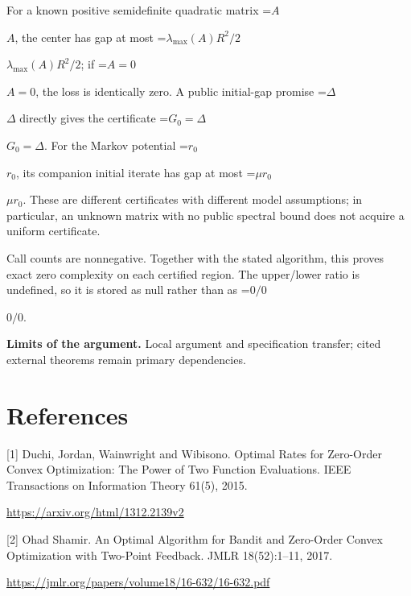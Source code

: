 \documentclass[10pt,a4paper]{article}
\newcommand{\AtlasMath}[1]{\par\begingroup\centering\setbox0=\hbox{$\displaystyle #1$}\ifdim\wd0>1.4\linewidth\typeout{ATLAS WIDE FORMULA: \the\wd0}\fi\ifdim\wd0>\linewidth\resizebox{\linewidth}{!}{\box0}\else\box0\fi\par\endgroup}
\newcommand{\AtlasInlineMath}[1]{\begingroup\setbox0=\hbox{$#1$}\ifdim\wd0>.4\linewidth\endgroup\AtlasMath{#1}\else\endgroup$#1$\fi}
\begin{document}
For a known positive semidefinite quadratic matrix \AtlasInlineMath{A}, the center has gap at most \AtlasInlineMath{\lambda_{\max}(A)R^2/2}; if \AtlasInlineMath{A=0}, the loss is identically zero. A public initial-gap promise \AtlasInlineMath{\Delta} directly gives the certificate \AtlasInlineMath{G_0=\Delta}. For the Markov potential \AtlasInlineMath{r_0}, its companion initial iterate has gap at most \AtlasInlineMath{\mu r_0}. These are different certificates with different model assumptions; in particular, an unknown matrix with no public spectral bound does not acquire a uniform certificate.

Call counts are nonnegative. Together with the stated algorithm, this proves exact zero complexity on each certified region. The upper/lower ratio is undefined, so it is stored as null rather than as \AtlasInlineMath{0/0}.

\textbf{Limits of the argument.} Local argument and specification transfer; cited external theorems remain primary dependencies.

\section{References}
[1] Duchi, Jordan, Wainwright and Wibisono. Optimal Rates for Zero-Order Convex Optimization: The Power of Two Function Evaluations. IEEE Transactions on Information Theory 61(5), 2015.

\url{https://arxiv.org/html/1312.2139v2}

[2] Ohad Shamir. An Optimal Algorithm for Bandit and Zero-Order Convex Optimization with Two-Point Feedback. JMLR 18(52):1--11, 2017.

\url{https://jmlr.org/papers/volume18/16-632/16-632.pdf}
\end{document}
